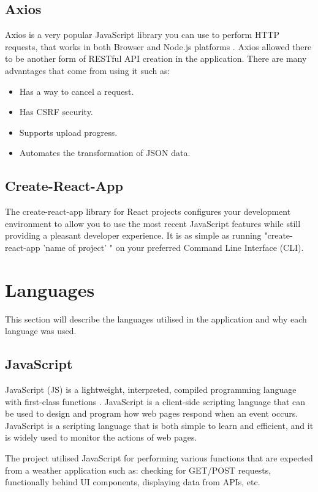 \subsection{Axios}
Axios is a very popular JavaScript library you can use to perform HTTP requests, that works in both Browser and Node.js platforms \cite{Axios}. Axios allowed there to be another form of RESTful API creation in the application. There are many advantages that come from using it such as:
\begin{itemize}
    \item Has a way to cancel a request.
    \item Has CSRF security.
    \item Supports upload progress.
    \item Automates the transformation of JSON data.
\end{itemize}

\subsection{Create-React-App}
The create-react-app library for React projects configures your development environment to allow you to use the most recent JavaScript features while still providing a pleasant developer experience. It is as simple as running "create-react-app 'name of project' " on your preferred Command Line Interface (CLI).

\section{Languages}
This section will describe the languages utilised in the application and why each language was used.

\subsection{JavaScript}
JavaScript (JS) is a lightweight, interpreted, compiled programming language with first-class functions \cite{JS}. JavaScript is a client-side scripting language that can be used to design and program how web pages respond when an event occurs. JavaScript is a scripting language that is both simple to learn and efficient, and it is widely used to monitor the actions of web pages.

The project utilised JavaScript for performing various functions that are expected from a weather application such as: checking for GET/POST requests, functionally behind UI components, displaying data from APIs, etc. 

